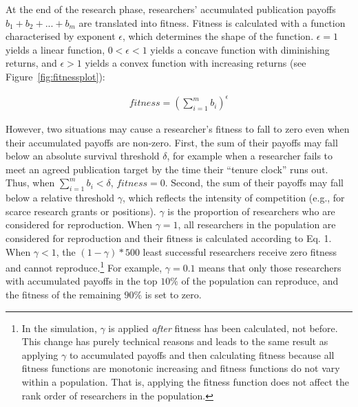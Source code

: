 \documentclass[
  ,man,mask,floatsintext]{apa6}
\begin{document}
At the end of the research phase, researchers' accumulated publication payoffs \(b_1 + b_2 + ... + b_m\) are translated into fitness.
Fitness is calculated with a function characterised by exponent \(\epsilon\), which determines the shape of the function. \(\epsilon = 1\) yields a linear function, \(0 < \epsilon < 1\) yields a concave function with diminishing returns, and \(\epsilon > 1\) yields a convex function with increasing returns (see Figure~\ref{fig:fitnessplot}):

\begin{align}
fitness = (\sum_{i=1}^{m} b_i)^\epsilon
\end{align}

However, two situations may cause a researcher's fitness to fall to zero even when their accumulated payoffs are non-zero.
First, the sum of their payoffs may fall below an absolute survival threshold \(\delta\), for example when a researcher fails to meet an agreed publication target by the time their ``tenure clock'' runs out.
Thus, when \(\sum_{i=1}^{m} b_i < \delta\), \(fitness = 0\).
Second, the sum of their payoffs may fall below a relative threshold \(\gamma\), which reflects the intensity of competition (e.g., for scarce research grants or positions).
\(\gamma\) is the proportion of researchers who are considered for reproduction.
When \(\gamma = 1\), all researchers in the population are considered for reproduction and their fitness is calculated according to Eq. 1.
When \(\gamma < 1\), the \((1 - \gamma)*500\) least successful researchers receive zero fitness and cannot reproduce.\footnote{In the simulation, \(\gamma\) is applied \emph{after} fitness has been calculated, not before. This change has purely technical reasons and leads to the same result as applying \(\gamma\) to accumulated payoffs and then calculating fitness because all fitness functions are monotonic increasing and fitness functions do not vary within a population. That is, applying the fitness function does not affect the rank order of researchers in the population.}
For example, \(\gamma = 0.1\) means that only those researchers with accumulated payoffs in the top \(10\%\) of the population can reproduce, and the fitness of the remaining \(90\%\) is set to zero.
\end{document}
